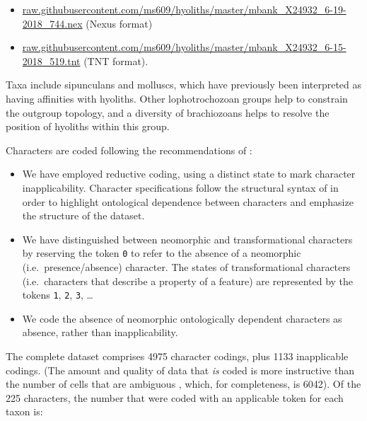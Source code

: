 \documentclass[openany]{book}
\begin{document}
\begin{itemize}
\item
  \href{https://raw.githubusercontent.com/ms609/hyoliths/master/mbank_X24932_6-19-2018_744.nex}{raw.githubusercontent.com/ms609/hyoliths/master/mbank\_X24932\_6-19-2018\_744.nex}
  (Nexus format)
\item
  \href{https://raw.githubusercontent.com/ms609/hyoliths/master/mbank_X24932_6-15-2018_519.tnt}{raw.githubusercontent.com/ms609/hyoliths/master/mbank\_X24932\_6-15-2018\_519.tnt}
  (TNT format).
\end{itemize}

Taxa include sipunculans and molluscs, which have previously been
interpreted as having affinities with hyoliths. Other lophotrochozoan
groups help to constrain the outgroup topology, and a diversity of
brachiozoans helps to resolve the position of hyoliths within this
group.

Characters are coded following the recommendations of
\citet{Brazeau2018}:

\begin{itemize}
\item
  We have employed reductive coding, using a distinct state to mark
  character inapplicability. Character specifications follow the
  structural syntax of \citet{Sereno2007} in order to highlight
  ontological dependence between characters and emphasize the structure
  of the dataset.
\item
  We have distinguished between neomorphic and transformational
  characters \citep[\emph{sensu}][]{Sereno2007} by reserving the token
  \texttt{0} to refer to the absence of a neomorphic
  (i.e.~presence/absence) character. The states of transformational
  characters (i.e.~characters that describe a property of a feature) are
  represented by the tokens \texttt{1}, \texttt{2}, \texttt{3}, \ldots{}
\item
  We code the absence of neomorphic ontologically dependent characters
  \citep[\emph{sensu}][]{Vogt2017} as absence, rather than
  inapplicability.
\end{itemize}

The complete dataset comprises 4975 character codings, plus 1133
inapplicable codings. (The amount and quality of data that \emph{is}
coded is more instructive than the number of cells that are ambiguous
\citep{Wiens1998, Wiens2003}, which, for completeness, is 6042). Of the
225 characters, the number that were coded with an applicable token for
each taxon is:
\end{document}
